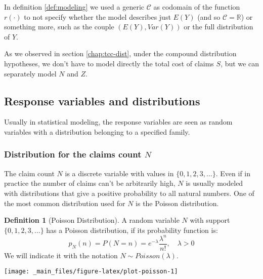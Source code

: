 \documentclass[a4paper, twoside, openright, 12pt]{report}
\let\origfigure\figure
\let\endorigfigure\endfigure
\renewenvironment{figure}[1][2] {
  \expandafter\origfigure\expandafter[!hbtp]
} {
  \endorigfigure
}
\theoremstyle{definition}
\newtheorem{definition}{Definition}[chapter]
\theoremstyle{definition}
\theoremstyle{definition}
\theoremstyle{remark}
\begin{document}
In definition \ref{def:modeling} we used a generic \(\mathcal{C}\) as codomain of the function \(r(\cdot)\) to not specify whether the model describes just \(E(Y)\) (and so \(\mathcal{C}=\mathbb{R}\)) or something more, such as the couple \(\left( E(Y), Var(Y) \right)\) or the full distribution of \(Y\).

As we observed in section \ref{chap:tcc-dist}, under the compound distribution hypotheses, we don't have to model directly the total cost of claims \(S\), but we can separately model \(N\) and \(Z\).

\hypertarget{chap:response-variables-and-distributions}{%
\subsection{Response variables and distributions}\label{chap:response-variables-and-distributions}}

Usually in statistical modeling, the response variables are seen as random variables with a distribution belonging to a specified family.

\hypertarget{chap:dist-n}{%
\subsubsection{\texorpdfstring{Distribution for the claims count \(N\)}{Distribution for the claims count N}}\label{chap:dist-n}}

The claim count \(N\) is a discrete variable with values in \(\{0, 1, 2, 3,\dots\}\). Even if in practice the number of claims can't be arbitrarily high, \(N\) is usually modeled with distributions that give a positive probability to all natural numbers. One of the most common distribution used for \(N\) is the Poisson distribution.

\begin{definition}[Poisson Distribution]
\label{def:def-poisson} \iffalse (Poisson Distribution) \fi{} A random variable \(N\) with support \(\{0,1,2,3,\dots \}\) has a Poisson distribution, if its probability function is:
\[
p_N(n) = P\left( N = n \right) = e^{-\lambda}\frac{\lambda^n}{n!}, \quad \lambda>0
\]
We will indicate it with the notation \(N \sim Poisson(\lambda)\).
\end{definition}

\begin{figure}[!hbtp]

{\centering \texttt{[image: \_main\_files/figure-latex/plot-poisson-1]} 

}

\caption{Poisson distribution for some values of $\lambda$.}\label{fig:plot-poisson}
\end{figure}
\end{document}
